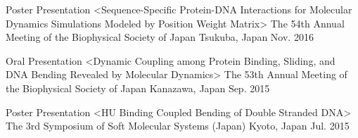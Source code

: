 

\begin{cventries}

  \cventry
    {Poster Presentation <Sequence-Specific Protein-DNA Interactions for
      Molecular Dynamics Simulations Modeled by Position Weight Matrix>} %
    {The 54th Annual Meeting of the Biophysical Society of Japan} %
    {Tsukuba, Japan} %
    {Nov. 2016} %
    {}

  \cventry
    {Oral Presentation <Dynamic Coupling among Protein Binding, Sliding, and DNA Bending Revealed by Molecular Dynamics>} %
    {The 53th Annual Meeting of the Biophysical Society of Japan} %
    {Kanazawa, Japan} %
    {Sep. 2015} %
    {}

  \cventry
    {Poster Presentation <HU Binding Coupled Bending of Double Stranded DNA>} %
    {The 3rd Symposium of Soft Molecular Systems (Japan)} %
    {Kyoto, Japan} %
    {Jul. 2015} %
    {}

\end{cventries}

